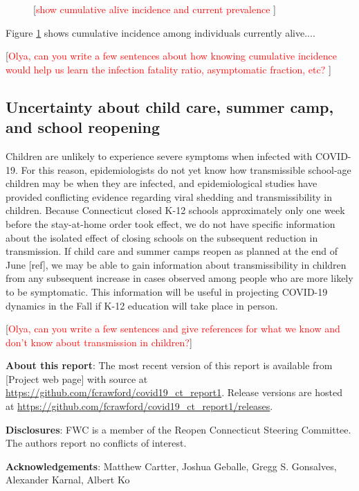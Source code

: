 \documentclass[11pt]{article}
\newcommand{\comment}[1]{[\textcolor{red}{#1}]}
\begin{document}
\begin{figure}
\centering
\caption{\comment{show cumulative alive incidence and current prevalence }}
\label{fig:cumincidence}
\end{figure}

Figure \ref{fig:cumincidence} shows cumulative incidence among individuals currently alive....


\comment{Olya, can you write a few sentences about how knowing cumulative incidence would help us learn the infection fatality ratio, asymptomatic fraction, etc? }



\subsection*{Uncertainty about child care, summer camp, and school reopening}

Children are unlikely to experience severe symptoms when infected with COVID-19. For this reason, epidemiologists do not yet know how transmissible school-age children may be when they are infected, and epidemiological studies have provided conflicting evidence regarding viral shedding and transmissibility in children. Because Connecticut closed K-12 schools approximately only one week before the stay-at-home order took effect, we do not have specific information about the isolated effect of closing schools on the subsequent reduction in transmission.  If child care and summer camps reopen as planned at the end of June [ref], we may be able to gain information about transmissibility in children from any subsequent increase in cases observed among people who are more likely to be symptomatic.  This information will be useful in projecting COVID-19 dynamics in the Fall if K-12 education will take place in person. 


\comment{Olya, can you write a few sentences and give references for what we know and don't know about transmission in children?}







\textbf{About this report}: The most recent version of this report is available from [Project web page] with source at \url{https://github.com/fcrawford/covid19_ct_report1}. Release versions are hosted at \url{https://github.com/fcrawford/covid19_ct_report1/releases}. 



\textbf{Disclosures}: FWC is a member of the Reopen Connecticut Steering Committee.  The authors report no conflicts of interest. 



\textbf{Acknowledgements}:
Matthew Cartter,
Joshua Geballe,
Gregg S. Gonsalves,
Alexander Karnal,
Albert Ko 






\end{document}
